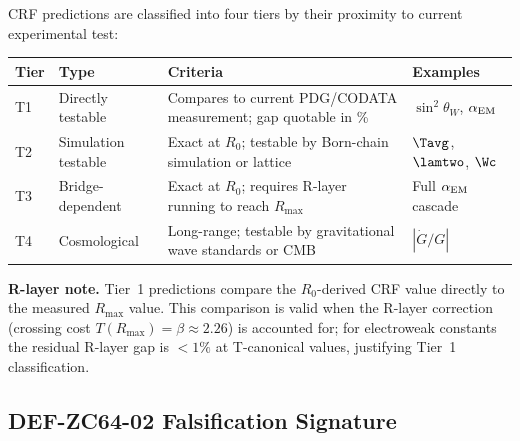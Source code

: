 \documentclass[12pt, a4paper]{article}
\renewcommand{\swsq}{\sin^2\!\theta_W}
\renewcommand{\aEM}{\alpha_{\rm EM}}
\begin{document}

\begin{formalbox}[title={DEF-ZC64-01: Four-Tier Prediction
  Classification ($R_0$ unless noted)}]
CRF predictions are classified into four tiers by their
proximity to current experimental test:

\medskip
\begin{center}
{\small\renewcommand{\arraystretch}{1.4}
\begin{tabular}{@{}p{0.8cm}p{3.2cm}p{4.8cm}p{2.8cm}@{}}
\toprule
\textbf{Tier} & \textbf{Type} & \textbf{Criteria} & \textbf{Examples} \\
\midrule
T1 & Directly testable & Compares to current PDG/CODATA measurement; gap quotable in \% & $\swsq$, $\aEM$ \\
T2 & Simulation testable & Exact at $R_0$; testable by Born-chain simulation or lattice & $\Tavg$, $\lamtwo$, $\Wc$ \\
T3 & Bridge-dependent & Exact at $R_0$; requires R-layer running to reach $R_{\max}$ & Full $\aEM$ cascade \\
T4 & Cosmological & Long-range; testable by gravitational wave standards or CMB & $|\dot{G}/G|$ \\
\bottomrule
\end{tabular}
}
\end{center}

\medskip
\textbf{R-layer note.}
Tier~1 predictions compare the $R_0$-derived CRF value
directly to the measured $R_{\max}$ value.
This comparison is valid when the R-layer correction
(crossing cost $T(R_{\max}) = \beta \approx 2.26$) is
accounted for; for electroweak constants the
residual R-layer gap is $<\!1\%$ at T-canonical values,
justifying Tier~1 classification.
\end{formalbox}

\subsection{DEF-ZC64-02 \quad Falsification Signature}
\label{sec:def02}

\end{document}
